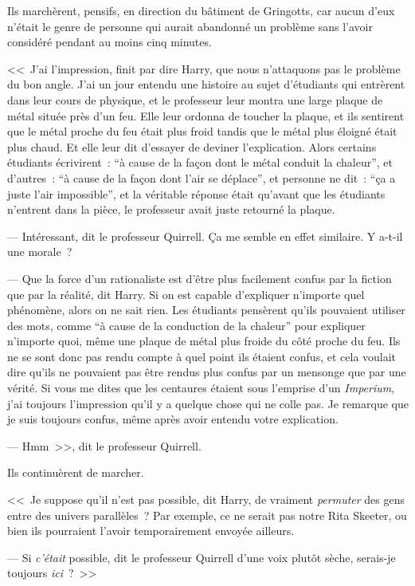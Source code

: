 Ils marchèrent, pensifs, en direction du bâtiment de Gringotts, car aucun d'eux n'était le genre de personne qui aurait abandonné un problème sans l'avoir considéré pendant au moins cinq minutes.

<<~J'ai l'impression, finit par dire Harry, que nous n'attaquons pas le problème du bon angle. J'ai un jour entendu une histoire au sujet d'étudiants qui entrèrent dans leur cours de physique, et le professeur leur montra une large plaque de métal située près d'un feu. Elle leur ordonna de toucher la plaque, et ils sentirent que le métal proche du feu était plus froid tandis que le métal plus éloigné était plus chaud. Et elle leur dit d'essayer de deviner l'explication. Alors certains étudiants écrivirent~: “à cause de la façon dont le métal conduit la chaleur”, et d'autres~: “à cause de la façon dont l'air se déplace”, et personne ne dit~: “ça a juste l'air impossible”, et la véritable réponse était qu'avant que les étudiants n'entrent dans la pièce, le professeur avait juste retourné la plaque.

--- Intéressant, dit le professeur Quirrell. Ça me semble en effet similaire. Y a-t-il une morale~?

--- Que la force d'un rationaliste est d'être plus facilement confus par la fiction que par la réalité, dit Harry. Si on est capable d'expliquer n'importe quel phénomène, alors on ne sait rien. Les étudiants pensèrent qu'ils pouvaient utiliser des mots, comme “à cause de la conduction de la chaleur” pour expliquer n'importe quoi, même une plaque de métal plus froide du côté proche du feu. Ils ne se sont donc pas rendu compte à quel point ils étaient confus, et cela voulait dire qu'ils ne pouvaient pas être rendus plus confus par un mensonge que par une vérité. Si vous me dites que les centaures étaient sous l'emprise d'un \emph{Imperium}, j'ai toujours l'impression qu'il y a quelque chose qui ne colle pas. Je remarque que je suis toujours confus, même après avoir entendu votre explication.

--- Hmm~>>, dit le professeur Quirrell.

Ils continuèrent de marcher.

<<~Je suppose qu'il n'est pas possible, dit Harry, de vraiment \emph{permuter} des gens entre des univers parallèles~? Par exemple, ce ne serait pas notre Rita Skeeter, ou bien ils pourraient l'avoir temporairement envoyée ailleurs.

--- Si \emph{c'était} possible, dit le professeur Quirrell d'une voix plutôt sèche, serais-je toujours \emph{ici}~?~>>


